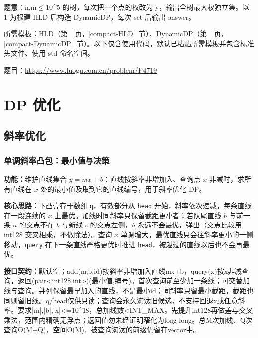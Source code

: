 \label{usage-example-457}

题意：n,m$\le$10\textasciicircum{}5 的树，每次把一个点的权改为 y，输出全树最大权独立集。以 1 为根建 HLD 后构造 DynamicDP，每次 set 后输出 answer。

所需模板：\hyperref[compact-HLD]{HLD}（第~\pageref{compact-HLD}~页，\ref{compact-HLD}~节）、\hyperref[compact-DynamicDP]{DynamicDP}（第~\pageref{compact-DynamicDP}~页，\ref{compact-DynamicDP}~节）。以下仅含使用代码，默认已粘贴所需模板并包含标准头文件、使用 std 命名空间。

题目：\url{https://www.luogu.com.cn/problem/P4719}



\Needspace{180pt}

\chapter{DP 优化}

\section{斜率优化}

\subsection{单调斜率凸包：最小值与决策}\label{compact-MonotoneHull}

\noindent\textbf{功能：}\allowbreak 维护直线集合 $y=mx+b$：直线按斜率非增加入、查询点 $x$ 非减时，求所有直线在 $x$ 处的最小值及取到它的直线编号，用于斜率优化 DP。

\textbf{核心思路：}\allowbreak 下凸壳存于数组 \texttt{q}，有效部分从 \texttt{head} 开始，斜率依次递减，每条直线在一段连续的 $x$ 上最优。加线时同斜率只保留截距更小者；若队尾直线 $b$ 与前一条 $a$ 的交点不在 $b$ 与新线 $c$ 的交点左侧，$b$ 永远不会最优，弹出（交点比较用 int128 交叉相乘，不做除法）。查询 $x$ 单调增大，最优直线只会往斜率更小的一侧移动，\texttt{query} 在下一条直线严格更优时推进 \texttt{head}，被越过的直线以后也不会再最优。



{\sloppy{}\noindent\textbf{接口契约：}默认空；add(m,b,id)按斜率非增加入直线mx+b，query(x)按x非减查询，返回(pair<int128,int>)(最小值,编号)。首次查询前至少加一条线；可交替加线与查询。并列保留最早加入的直线，不是最小id；同斜率只留最小截距，截距也同则留旧线。q/head仅供只读；查询会永久淘汰旧候选，不支持回退x或任意斜率。要求|m|,|b|,|x|<=10\textasciicircum{}18，总加线数<INT\_MAX。先提升int128再做差与交叉乘法，范围内精确无浮点；返回值勿未经证明窄化为long long。总M次加线、Q次查询O(M+Q)，空间O(M)，被查询淘汰的前缀仍留在vector中。\par}

